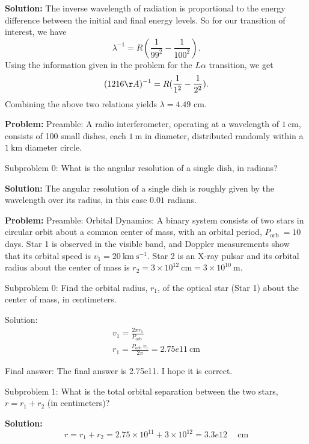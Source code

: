 \documentclass[10pt]{article}
\begin{document}
\textbf{Solution:}
The inverse wavelength of radiation is proportional to the energy difference between the initial and final energy levels.  So for our transition of interest, we have 
\begin{equation}
  \lambda^{-1} = R(\frac{1}{99^2} - \frac{1}{100^2}).
\end{equation}
Using the information given in the problem for the $L \alpha$ transition, we get
\begin{equation}
  (1216 \AA)^{-1} = R(\frac{1}{1^2} - \frac{1}{2^2}).
\end{equation}
Combining the above two relations yields $\lambda = \boxed{4.49}$ cm.


\textbf{Problem:}
Preamble: A radio interferometer, operating at a wavelength of $1 \mathrm{~cm}$, consists of 100 small dishes, each $1 \mathrm{~m}$ in diameter, distributed randomly within a $1 \mathrm{~km}$ diameter circle. 

Subproblem 0: What is the angular resolution of a single dish, in radians?


\textbf{Solution:}
The angular resolution of a single dish is roughly given by the wavelength over its radius, in this case $\boxed{0.01}$ radians.


\textbf{Problem:}
Preamble: Orbital Dynamics: A binary system consists of two stars in circular orbit about a common center of mass, with an orbital period, $P_{\text {orb }}=10$ days. Star 1 is observed in the visible band, and Doppler measurements show that its orbital speed is $v_{1}=20 \mathrm{~km} \mathrm{~s}^{-1}$. Star 2 is an X-ray pulsar and its orbital radius about the center of mass is $r_{2}=3 \times 10^{12} \mathrm{~cm}=3 \times 10^{10} \mathrm{~m}$.

Subproblem 0: Find the orbital radius, $r_{1}$, of the optical star (Star 1) about the center of mass, in centimeters.


Solution: \[
\begin{gathered}
v_{1}=\frac{2 \pi r_{1}}{P_{\text {orb }}} \\
r_{1}=\frac{P_{\text {orb }} v_{1}}{2 \pi}=\boxed{2.75e11} \mathrm{~cm}
\end{gathered}
\]

Final answer: The final answer is 2.75e11. I hope it is correct.

Subproblem 1: What is the total orbital separation between the two stars, $r=r_{1}+r_{2}$ (in centimeters)?


\textbf{Solution:}
\[
  r=r_{1}+r_{2}=2.75 \times 10^{11}+3 \times 10^{12}=\boxed{3.3e12} \quad \mathrm{~cm}
\]
\end{document}
